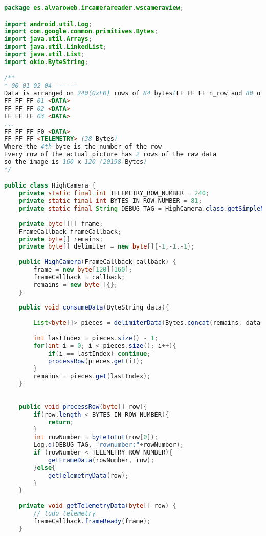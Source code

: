 \documentclass[hidelinks,11pt,a4paper,oneside,article]{memoir}
\begin{document}
\begin{lstlisting}[label={listing:highcamera},caption={HighCamera class, represents a frame},language=Java, style=styleprogrammingappendix]
package es.alvaroweb.ircamerareader.wscameraview;

import android.util.Log;
import com.google.common.primitives.Bytes;
import java.util.Arrays;
import java.util.LinkedList;
import java.util.List;
import okio.ByteString;

/**
* 00 01 02 04 ------
Data is arranged on 240(0xF0) rows of 84 bytes(FF FF FF n_row and 80 of data):
FF FF FF 01 <DATA>
FF FF FF 02 <DATA>
FF FF FF 03 <DATA>
...
FF FF FF F0 <DATA>
FF FF FF <TELEMETRY> (38 Bytes)
Where the 4th byte is the number of the row
Every row of the actual picture has 2 rows of the raw data
so the image is 160 x 120 (20198 Bytes)
*/

public class HighCamera {
    private static final int TELEMETRY_ROW_NUMBER = 240;
    private static final int BYTES_IN_ROW_NUMBER = 81;
    private static final String DEBUG_TAG = HighCamera.class.getSimpleName();
    
    private byte[][] frame;
    FrameCallback frameCallback;
    private byte[] remains;
    private byte[] delimiter = new byte[]{-1,-1,-1};
    
    public HighCamera(FrameCallback callback) {
        frame = new byte[120][160];
        frameCallback = callback;
        remains = new byte[]{};
    }
    
    public void consumeData(ByteString data){
        
        List<byte[]> pieces = delimiterData(Bytes.concat(remains, data.toByteArray()), delimiter);
        
        int lastIndex = pieces.size() - 1;
        for(int i = 0; i < pieces.size(); i++){
            if(i == lastIndex) continue;
            processRow(pieces.get(i));
        }
        remains = pieces.get(lastIndex);
    }
    
    
    public void processRow(byte[] row){
        if(row.length < BYTES_IN_ROW_NUMBER){
            return;
        }
        int rowNumber = byteToInt(row[0]);
        Log.d(DEBUG_TAG, "rownumber:"+rowNumber);
        if (rowNumber < TELEMETRY_ROW_NUMBER){
            getFrameData(rowNumber, row);
        }else{
            getTelemetryData(row);
        }
    }
    
    private void getTelemetryData(byte[] row) {
        // todo telemetry
        frameCallback.frameReady(frame);
    }
    

\end{lstlisting}
\end{document}
